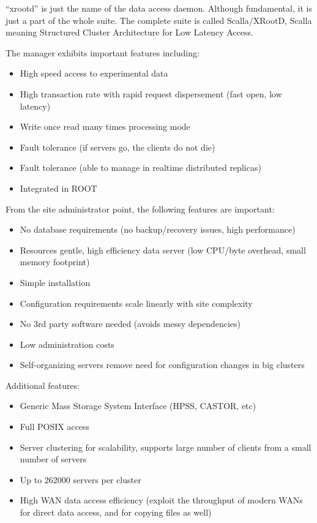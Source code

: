 ``xrootd'' is just the name of the data access daemon. Although
fundamental, it is just a part of the whole suite. The complete
suite is called Scalla/XRootD, Scalla meaning Structured Cluster
Architecture for Low Latency Access.

The manager exhibits important features including:
%
\begin{itemize}
\item High speed access to experimental data
\item High transaction rate with rapid request dispersement (fast
open, low latency)
\item Write once read many times processing mode
\item Fault tolerance (if servers go, the clients do not die)
\item Fault tolerance (able to manage in realtime distributed
replicas)
\item Integrated in ROOT
\end{itemize}

From the site administrator point, the following features are
important:
\begin{itemize}
\item  No database requirements (no backup/recovery issues, high
performance)
\item Resources gentle, high efficiency data server (low
CPU/byte overhead, small memory footprint)
\item  Simple installation
\item Configuration requirements scale linearly with site complexity
\item No 3rd party software needed (avoids messy dependencies)
\item Low administration costs
\item Self-organizing servers remove need for
configuration changes in big clusters
\end{itemize}

Additional features:
\begin{itemize}
\item Generic Mass Storage System Interface (HPSS, CASTOR, etc)
\item Full POSIX access
\item Server clustering for scalability, supports large number of
clients from a small number of servers
\item Up to 262000 servers per cluster
\item High WAN data access efficiency (exploit the throughput of
modern WANs for direct data access, and for copying files as well)
\end{itemize}

